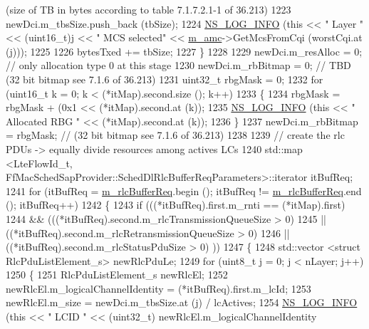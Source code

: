 \begin{DoxyCode}
{       (size of TB in bytes according to table 7.1.7.2.1-1 of 36.213)}
1223           newDci.m\_tbsSize.push\_back (tbSize);
1224           \hyperlink{group__logging_gafbd73ee2cf9f26b319f49086d8e860fb}{NS\_LOG\_INFO} (\textcolor{keyword}{this} << \textcolor{stringliteral}{" Layer "} << (uint16\_t)j << \textcolor{stringliteral}{" MCS selected"} << 
      \hyperlink{classns3_1_1TtaFfMacScheduler_a9c8e60d48cae88a03fb5621285733186}{m\_amc}->GetMcsFromCqi (worstCqi.at (j)));
1225 
1226           bytesTxed += tbSize;
1227         \}
1228 
1229       newDci.m\_resAlloc = 0;  \textcolor{comment}{// only allocation type 0 at this stage}
1230       newDci.m\_rbBitmap = 0; \textcolor{comment}{// TBD (32 bit bitmap see 7.1.6 of 36.213)}
1231       uint32\_t rbgMask = 0;
1232       \textcolor{keywordflow}{for} (uint16\_t k = 0; k < (*itMap).second.size (); k++)
1233         \{
1234           rbgMask = rbgMask + (0x1 << (*itMap).second.at (k));
1235           \hyperlink{group__logging_gafbd73ee2cf9f26b319f49086d8e860fb}{NS\_LOG\_INFO} (\textcolor{keyword}{this} << \textcolor{stringliteral}{" Allocated RBG "} << (*itMap).second.at (k));
1236         \}
1237       newDci.m\_rbBitmap = rbgMask; \textcolor{comment}{// (32 bit bitmap see 7.1.6 of 36.213)}
1238 
1239       \textcolor{comment}{// create the rlc PDUs -> equally divide resources among actives LCs}
1240       std::map <LteFlowId\_t, FfMacSchedSapProvider::SchedDlRlcBufferReqParameters>::iterator itBufReq;
1241       \textcolor{keywordflow}{for} (itBufReq = \hyperlink{classns3_1_1TtaFfMacScheduler_a55188f3ad1e0b4a62947e3e3ccb63ec5}{m\_rlcBufferReq}.begin (); itBufReq != 
      \hyperlink{classns3_1_1TtaFfMacScheduler_a55188f3ad1e0b4a62947e3e3ccb63ec5}{m\_rlcBufferReq}.end (); itBufReq++)
1242         \{
1243           \textcolor{keywordflow}{if} (((*itBufReq).first.m\_rnti == (*itMap).first)
1244               && (((*itBufReq).second.m\_rlcTransmissionQueueSize > 0)
1245                   || ((*itBufReq).second.m\_rlcRetransmissionQueueSize > 0)
1246                   || ((*itBufReq).second.m\_rlcStatusPduSize > 0) ))
1247             \{
1248               std::vector <struct RlcPduListElement\_s> newRlcPduLe;
1249               \textcolor{keywordflow}{for} (uint8\_t j = 0; j < nLayer; j++)
1250                 \{
1251                   RlcPduListElement\_s newRlcEl;
1252                   newRlcEl.m\_logicalChannelIdentity = (*itBufReq).first.m\_lcId;
1253                   newRlcEl.m\_size = newDci.m\_tbsSize.at (j) / lcActives;
1254                   \hyperlink{group__logging_gafbd73ee2cf9f26b319f49086d8e860fb}{NS\_LOG\_INFO} (\textcolor{keyword}{this} << \textcolor{stringliteral}{" LCID "} << (uint32\_t) newRlcEl.m\_logicalChannelIdentity 

\end{DoxyCode}
